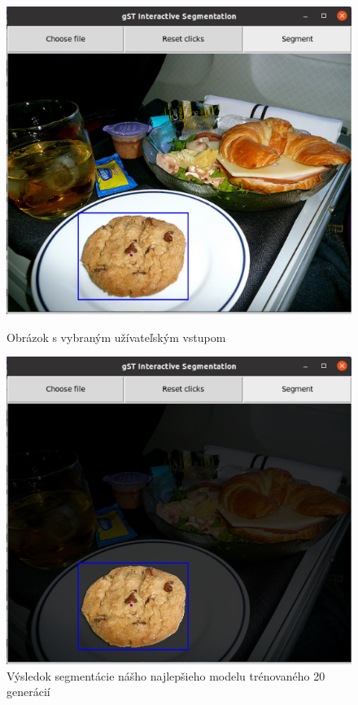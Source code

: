 \documentclass [11pt, a4paper, twocolumn]{article}
\begin{document}
\begin{figure}[H]
\centering
\begin{minipage}[H]{0.75\linewidth}
\includegraphics[width=\linewidth]{cookie_GUI_bef}
\caption{Obrázok s vybraným užívateľským vstupom}
\end{minipage}
\quad
\begin{minipage}[H]{0.75\linewidth}
\includegraphics[width=\linewidth]{cookie_GUI}
\caption{Výsledok segmentácie nášho najlepšieho modelu trénovaného 20 generácií}
\end{minipage}
\end{figure}
\end{document}
